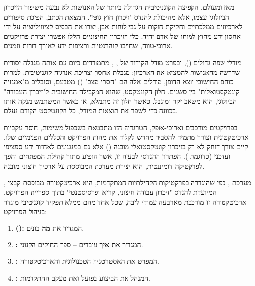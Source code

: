 

מאז ומעולם, הקפיצה הקוגניטיבית הגדולה ביותר של האנושות לא נבעה משיפור הזיכרון הביולוגי עצמו, אלא מהיכולת להנדס "זיכרון חוץ-גופי". המצאת הכתב, הפיכת סיפורים לארכיונים ממלכתיים וחקיקת חוקות על גבי לוחות אבן, יצרו את הבסיס לציוויליזציה על ידי אחסון ידע מחוץ למוחו של אדם יחיד. כלי הזיכרון החיצוניים הללו אפשרו יצירת פרויקטים ארוכי-טווח, שחייבו קוהרנטיות ורציפות ידע לאורך דורות וזמנים.

מודלי שפה גדולים (), ובפרט מודל הקידוד של , , מתמודדים כיום עם אותה מגבלה יסודית שדרשה מהאנושות להמציא את הארכיון: מגבלת אחסון וצריכת אנרגיה קוגניטיבית. למרות כוחם החישובי יוצא הדופן, מודלים אלה הם "חסרי מצב" () מטבעם, וסובלים מ"אמנזיה קונטקסטואלית" בין סשנים. חלון הקונטקסט, שהוא המקבילה החישובית ל"זיכרון העבודה" הביולוגי, הוא משאב יקר ומוגבל. כאשר חלון זה מתמלא, או כאשר המשתמש מנקה אותו בכוונה כדי לשפר את תוצאות המודל, כל הקונטקסט הקודם נעלם.

בפרויקטים מורכבים וארוכי-אופק, הטרגדיה הזו מתבטאת בשכפול משימות, חוסר עקביות ארכיטקטונית וצורך מתמיד להסביר מחדש לקלוד את מהות הפרויקט והכללים הפנימיים שלו. קיים צורך דוחק לא רק בזיכרון קונטקסטואלי מובנה () אלא גם במנגנונים לאחזור ידע ספציפי ועדכני (כדוגמת ). הפתרון ההנדסי לבעיה זו, אשר הופיע מתוך קהילת המפתחים והפך לפרקטיקה דומיננטית, הוא יצירת מערכת  המבוססת על ארכיון חיצוני מובנה.


מערכת , כפי שהוגדרה בפרקטיקות הקהילתיות המתקדמות, היא ארכיטקטורה מבוססת קבצי , המיועדת להנדס "זיכרון עבודה חיצוני, קריא ופרסיסטנטי" בתוך ספריית הפרויקט. ארכיטקטורה זו מורכבת מארבעה עמודי ליבה, שכל אחד מהם ממלא תפקיד קוגניטיבי מוגדר בניהול הפרויקט:

\begin{enumerate}
  \item \textbf{ ():} המגדיר את \textbf{מה} בונים.
  \item \textbf{:} המגדיר את \textbf{איך} עובדים – ספר החוקים הקנוני.
  \item \textbf{:} המפרט את האסטרטגיה הטכנולוגית והארכיטקטורה.
  \item \textbf{:} המנהל את הביצוע בפועל ואת מעקב ההתקדמות.
\end{enumerate}

